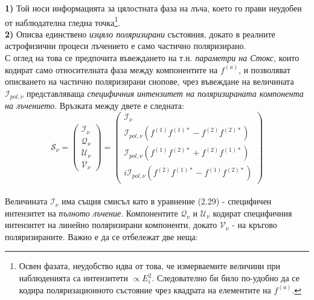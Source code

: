\noindent\textbf{1)} Той носи информацията за цялостната фаза на лъча, което го прави неудобен от наблюдателна гледна точка\footnote{Освен фазата, неудобство идва от това, че измерваемите величини при наблюденията са интензитети $\propto E_i^2$. Следователно би било по-удобно да се кодира поляризационното състояние чрез квадрата на елементите на $f^{(a)}$.}.\\

\noindent\textbf{2)} Описва единствено \emph{изцяло поляризирани} състояния, докато в реалните астрофизични процеси лъчението е само частично поляризирано.\\

\noindent С оглед на това се предпочита въвеждането на т.н. \emph{параметри на Стокс}, които кодират само относителната фаза между компонентите на $f^{(a)}$, и позволяват описването на частично поляризирани снопове, чрез въвеждане на величината $\mathcal{I}_{pol, \nu}$ представляваща \emph{специфичния интензитет на поляризираната компонента на лъчението}. Връзката между двете е следната:\\

\begin{equation}
	\mathcal{S}_\nu = \begin{pmatrix}
					\mathcal{I}_\nu \\
					\mathcal{Q}_\nu \\
					\mathcal{U}_\nu \\
					\mathcal{V}_\nu
				\end{pmatrix} = 
				\begin{pmatrix}
					\mathcal{I}_\nu \\
					\mathcal{I}_{pol, \nu} \left(f^{(1)} f^{(1)*} - f^{(2)} f^{(2)*} \right) \\
					\mathcal{I}_{pol, \nu} \left(f^{(1)} f^{(2)*} + f^{(2)} f^{(1)*} \right) \\
					i\mathcal{I}_{pol, \nu} \left(f^{(2)} f^{(1)*} - f^{(1)} f^{(2)*} \right)	
				\end{pmatrix} 
\end{equation}\\

\noindent Величината $\mathcal{I}_\nu$ има същия смисъл като в уравнение (2.29) - специфичен интензитет на \emph{пълното лъчение}. Компонентите $\mathcal{Q}_\nu$ и $\mathcal{U}_\nu$ кодират специфичния интензитет на линейно поляризирани компоненти, докато $\mathcal{V}_\nu$ - на кръгово поляризираните. Важно е да се отбележат две неща:\\\newline

